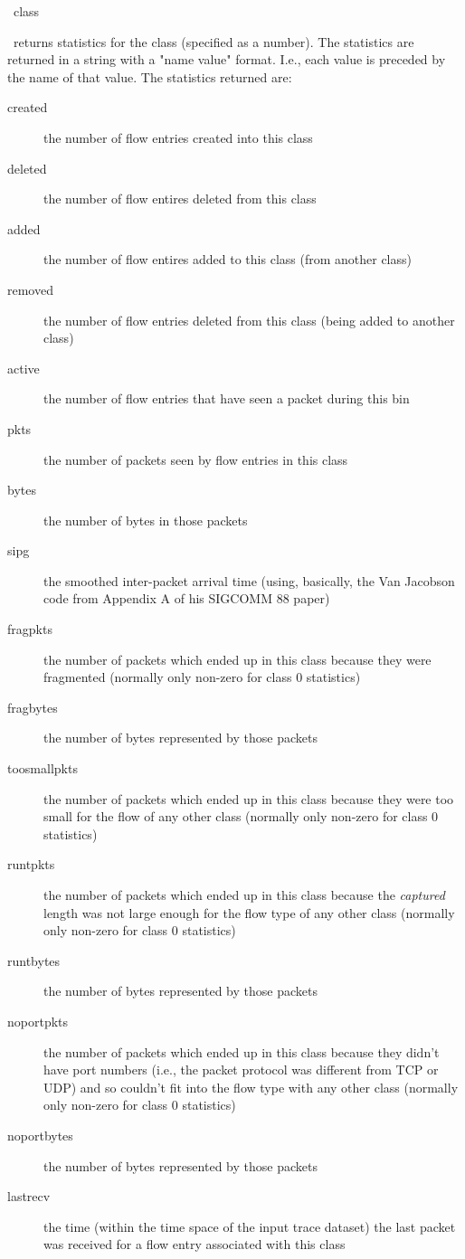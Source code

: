 \documentclass{article}
\begin{document}
\manend

\label{sec:fsim_class_summary}

\SYNOPSIS \cmdname\ class

\DESCRIPTION

\cmdname\ returns statistics for the class 
(specified as a number).  The statistics are returned in a string with
a "name value" format.  I.e., each value is preceded by the name of
that value.  The statistics returned are:
\begin{description}
\item[created] the number of flow entries created into this class
\item[deleted] the number of flow entires deleted from this class
\item[added] the number of flow entires added to this class (from
another class)
\item[removed] the number of flow entries deleted from this class
(being added to another class)
\item[active] the number of flow entries that have seen a packet during
this bin
\item[pkts] the number of packets seen by flow entries in this class
\item[bytes] the number of bytes in those packets
\item[sipg] the smoothed inter-packet arrival time (using, basically,
the Van Jacobson code from Appendix A of his SIGCOMM 88 paper)
\item[fragpkts] the number of packets which ended up in this class
because they were fragmented (normally only non-zero for class 0 statistics)
\item[fragbytes] the number of bytes represented by those packets
\item[toosmallpkts] the number of packets which ended up in this class
because they were too small for the flow of any other class
(normally only non-zero for class 0 statistics)
\item[runtpkts] the number of packets which ended up in this class
because the \emph{captured} length was not large enough for the flow
type of any other class (normally only non-zero for class 0 statistics)
\item[runtbytes] the number of bytes represented by those packets
\item[noportpkts] the number of packets which ended up in this class
because they didn't have port numbers (i.e., the packet protocol was
different from TCP or UDP) and so couldn't fit into the flow type with
any other class (normally only non-zero for class 0 statistics)
\item[noportbytes] the number of bytes represented by those packets
\item[lastrecv] the time (within the time space of the input trace
dataset) the last packet was received for a flow entry associated with
this class
\end{description}
\end{document}
